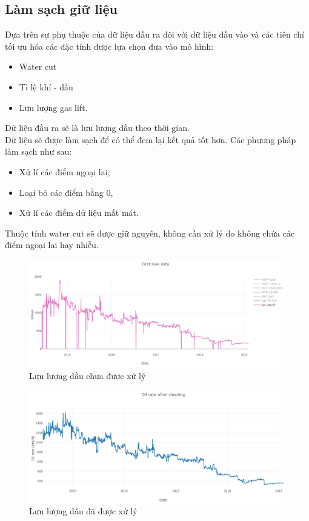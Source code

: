 \documentclass[12pt,a4paper]{report}
\begin{document}
\subsection{Làm sạch giữ liệu}
Dựa trên sự phụ thuộc của dữ liệu đầu ra đôi với dữ liệu đầu vào và các tiêu chí tối ưu hóa các đặc tính được lựa chọn đưa vào mô hình:
    \begin{itemize}
        \item Water cut
        \item Tỉ lệ khí - dầu
        \item Lưu lượng gas lift.
    \end{itemize}
Dữ liệu đầu ra sẽ là lưu lượng dầu theo thời gian.\\
Dữ liệu sẽ được làm sạch để có thể đem lại kết quả tốt hơn. Các phương pháp làm sạch như sau:
    \begin{itemize}
        \item Xử lí các điểm ngoại lai,
        \item Loại bỏ các điểm bằng 0,
        \item Xử lí các điểm dữ liệu mất mát.
    \end{itemize}
Thuộc tính water cut sẽ được giữ nguyên, không cần xử lý do không chứa các điểm ngoại lai hay nhiễu.
    \begin{figure}[h]
        \centering
        \includegraphics[scale=0.55]{fig/q_oil_before.PNG}
        \caption{Lưu lượng dầu chưa được xử lý}
        \label{fig:q_oil_before}
    \end{figure}
    \begin{figure}[h]
        \centering
        \includegraphics[scale=.55]{fig/q_oil_after.PNG}
        \caption{Lưu lượng dầu đã được xử lý}
        \label{fig:q_oil_after}
    \end{figure}
\end{document}
